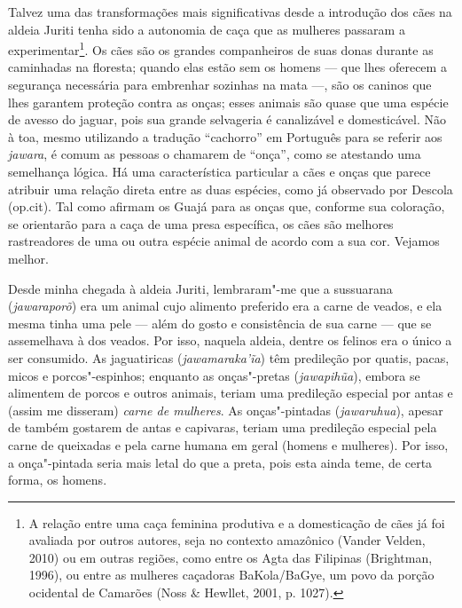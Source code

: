 Talvez uma das transformações mais significativas desde a introdução dos
cães na aldeia Juriti tenha sido a autonomia de caça que as mulheres
passaram a experimentar\footnote{A relação entre uma caça feminina
  produtiva e a domesticação de cães já foi avaliada por outros autores,
  seja no contexto amazônico (Vander Velden, 2010) ou em outras regiões,
  como entre os Agta das Filipinas (Brightman, 1996), ou entre as
  mulheres caçadoras BaKola/BaGye, um povo da porção ocidental de
  Camarões (Noss \& Hewllet, 2001, p. 1027).}. Os cães são os grandes
companheiros de suas donas durante as caminhadas na floresta; quando
elas estão sem os homens --- que lhes oferecem a segurança necessária para
embrenhar sozinhas na mata ---, são os caninos que lhes garantem proteção
contra as onças; esses animais são quase que uma espécie de avesso do
jaguar, pois sua grande selvageria é canalizável e domesticável. Não à
toa, mesmo utilizando a tradução ``cachorro'' em Português para se referir
aos \emph{jawara}, é comum as pessoas o chamarem de ``onça'', como se
atestando uma semelhança lógica. Há uma característica particular a cães
e onças que parece atribuir uma relação direta entre as duas espécies,
como já observado por Descola (op.cit). Tal como afirmam os Guajá para
as onças que, conforme sua coloração, se orientarão para a caça de uma
presa específica, os cães são melhores rastreadores de uma ou outra
espécie animal de acordo com a sua cor. Vejamos melhor.

Desde minha chegada à aldeia Juriti, lembraram"-me que a sussuarana
(\emph{jawaraporõ}) era um animal cujo alimento preferido era a carne de
veados, e ela mesma tinha uma pele --- além do gosto e consistência de sua
carne --- que se assemelhava à dos veados. Por isso, naquela aldeia,
dentre os felinos era o único a ser consumido. As jaguatiricas
(\emph{jawamaraka'ĩa}) têm predileção por quatis, pacas, micos e
porcos"-espinhos; enquanto as onças"-pretas (\emph{jawapihũa}), embora se
alimentem de porcos e outros animais, teriam uma predileção especial por
antas e (assim me disseram) \emph{carne de mulheres}. As onças"-pintadas
(\emph{jawaruhua}), apesar de também gostarem de antas e capivaras,
teriam uma predileção especial pela carne de queixadas e pela carne
humana em geral (homens e mulheres). Por isso, a onça"-pintada seria mais
letal do que a preta, pois esta ainda teme, de certa forma, os homens.

